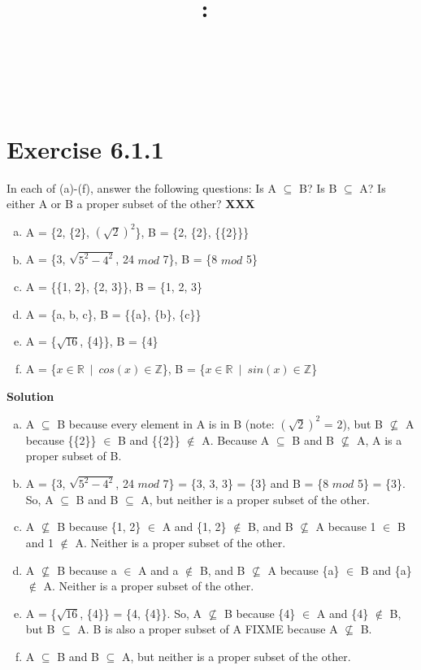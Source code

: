 \documentclass{article}
\title{
    \vspace{2in}
    \textmd{\textbf{\hmwkClass:\ \hmwkTitle}}\\
    \normalsize\vspace{0.1in}{\hmwkDueDate}\\
    \vspace{0.1in}\large{\textit{\hmwkClassInstructor\ \hmwkClassTime}}
    \vspace{3in}
}
\author{\textbf{\hmwkAuthorName}}
\date{}
\newcommand{\enterProblemHeader}[1]{
    \nobreak\extramarks{}{Exercise {#1} continued on next page\ldots}\nobreak{}
    \nobreak\extramarks{Exercise {#1} (continued)}{Exercise {#1} continued on next page\ldots}\nobreak{}
}
\newcommand{\exitProblemHeader}[1]{
    \nobreak\extramarks{Exercise {#1} (continued)}{Exercise {#1} continued on next page\ldots}\nobreak{}
    \nobreak\extramarks{Exercise \arabic{#1}}{}\nobreak{}
}
\newenvironment{homeworkProblem}[1][-1]{
    \nobreak\extramarks{Page \thepage}{}\nobreak{}
    \section{Exercise {#1}}
}{
}
\begin{document}

\begin{homeworkProblem}[6.1.1]
    In each of (a)-(f), answer the following questions: Is A $\subseteq$ B? Is
    B $\subseteq$ A? Is either A or B a proper subset of the other? \textbf{XXX}

    \begin{enumerate}[a.]
        \item A = \{2, \{2\}, $(\sqrt{2})^2$\}, B = \{2, \{2\}, \{\{2\}\}\}
        \item A = \{3, $\sqrt{5^2 - 4^2}$, 24 \(mod\) 7\}, B = \{8 \(mod\) 5\}
        \item A = \{\{1, 2\}, \{2, 3\}\}, B = \{1, 2, 3\}
        \item A = \{a, b, c\}, B = \{\{a\}, \{b\}, \{c\}\}
        \item A = \{$\sqrt{16}$, \{4\}\}, B = \{4\}
        \item A = \{$x \in \mathbb{R} ~\mid~ cos(x) \in \mathbb{Z}$\},
              B = \{$x \in \mathbb{R} ~\mid~ sin(x) \in \mathbb{Z}$\}
    \end{enumerate}

    \textbf{Solution}

    \begin{enumerate}[a.]
        \item A $\subseteq$ B because every element in A is in B
        (note: $(\sqrt{2})^2$ = 2), but B $\nsubseteq$ A because \{\{2\}\}
        $\in$ B and \{\{2\}\} $\notin$ A. Because A $\subseteq$ B and
        B $\nsubseteq$ A, A is a proper subset of B.
        \item A = \{3, $\sqrt{5^2 - 4^2}$, 24 \(mod\) 7\} = \{3, 3, 3\} = \{3\}
        and B = \{8 \(mod\) 5\} = \{3\}. So, A $\subseteq$ B and B $\subseteq$
        A, but neither is a proper subset of the other.
        \item A $\nsubseteq$ B because \{1, 2\} $\in$ A and \{1, 2\} $\notin$ B,
        and B $\nsubseteq$ A because 1 $\in$ B and 1 $\notin$ A. Neither is a
        proper subset of the other.
        \item A $\nsubseteq$ B because a $\in$ A and a $\notin$ B,
        and B $\nsubseteq$ A because \{a\} $\in$ B and \{a\} $\notin$ A. Neither
        is a proper subset of the other.
        \item A = \{$\sqrt{16}$, \{4\}\} = \{4, \{4\}\}. So, A $\nsubseteq$ B
        because \{4\} $\in$ A and \{4\} $\notin$ B, but B $\subseteq$ A. B is
        also a proper subset of A FIXME because A $\nsubseteq$ B.
        \item A $\subseteq$ B and B $\subseteq$ A, but neither is a proper
        subset of the other.
    \end{enumerate}

\end{homeworkProblem}
\end{document}
